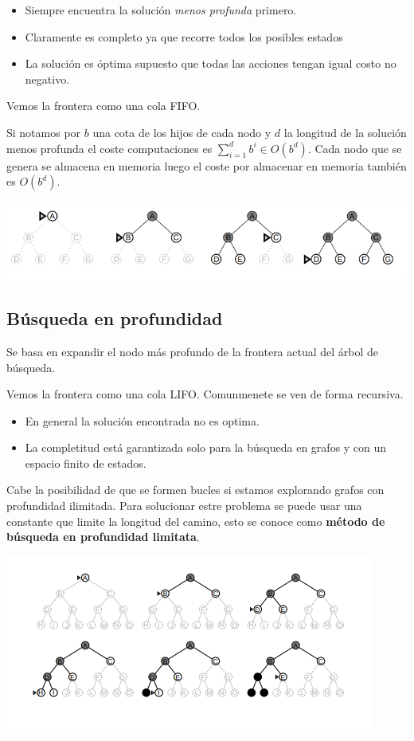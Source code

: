 \documentclass[12pt]{article}
\begin{document}
\begin{itemize}
\item Siempre encuentra la solución \textit{menos profunda} primero.
\item Claramente es completo ya que recorre todos los posibles estados
\item La solución es óptima supuesto que todas las acciones tengan
  igual costo no negativo.
\end{itemize}

Vemos la frontera como una cola FIFO.

Si notamos por $b$ una cota de los hijos de cada nodo y $d$ la
longitud de la solución menos profunda el coste computaciones es
$\sum_{i=1}^{d}b^i \in O(b^d)$. Cada nodo que se genera se almacena en
memoria luego el coste por almacenar en memoria también es $O(b^d)$.

\includegraphics[width=\textwidth]{anchura}

\subsection{Búsqueda en profundidad}

Se basa en expandir el nodo más profundo de la frontera actual del
árbol de búsqueda.

Vemos la frontera como una cola LIFO. Comunmenete se ven de forma
recursiva.

\begin{itemize}
\item En general la solución encontrada no es optima.
\item La completitud está garantizada solo para la búsqueda en grafos
  y con un espacio finito de estados.
\end{itemize}

Cabe la posibilidad de que se formen bucles si estamos explorando
grafos con profundidad ilimitada. Para solucionar estre problema se
puede usar una constante que limite la longitud del camino, esto se
conoce como \textbf{método de búsqueda en profundidad limitata}.

\includegraphics[width=\textwidth]{profundidad}
\end{document}
